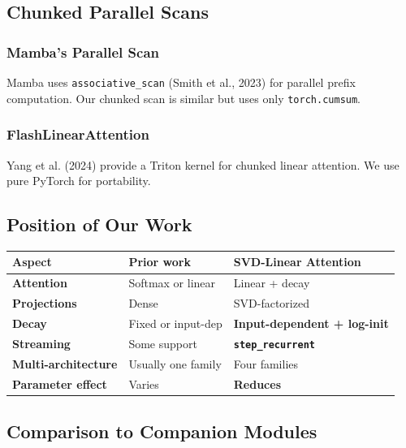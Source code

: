 \subsection{Chunked Parallel Scans}

\subsubsection{Mamba's Parallel Scan}

Mamba uses \texttt{associative\_scan} (Smith et al., 2023) for parallel prefix 
computation. Our chunked scan is similar but uses only \texttt{torch.cumsum}.

\subsubsection{FlashLinearAttention}

Yang et al. (2024) provide a Triton kernel for chunked linear attention. 
We use pure PyTorch for portability.

\subsection{Position of Our Work}

\begin{table}[H]
\centering
\small
\begin{tabular}{lll}
\toprule
\textbf{Aspect} & \textbf{Prior work} & \textbf{SVD-Linear Attention} \\
\midrule
\textbf{Attention} & Softmax or linear & Linear + decay \\
\textbf{Projections} & Dense & SVD-factorized \\
\textbf{Decay} & Fixed or input-dep & \textbf{Input-dependent + log-init} \\
\textbf{Streaming} & Some support & \textbf{\texttt{step\_recurrent}} \\
\textbf{Multi-architecture} & Usually one family & Four families \\
\textbf{Parameter effect} & Varies & \textbf{Reduces} \\
\bottomrule
\end{tabular}
\end{table}

\subsection{Comparison to Companion Modules}

